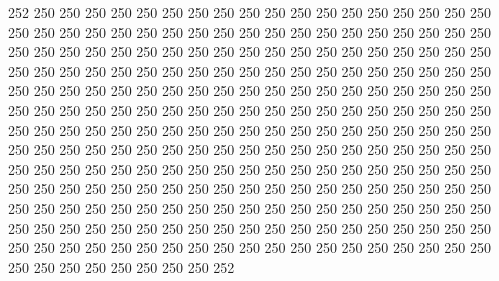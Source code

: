 252 250 250 250 250 250 250 250 250 250 250 250 250 250 250 250 250 250 250 250
250 250 250 250 250 250 250 250 250 250 250 250 250 250 250 250 250 250 250 250
250 250 250 250 250 250 250 250 250 250 250 250 250 250 250 250 250 250 250 250
250 250 250 250 250 250 250 250 250 250 250 250 250 250 250 250 250 250 250 250
250 250 250 250 250 250 250 250 250 250 250 250 250 250 250 250 250 250 250 250
250 250 250 250 250 250 250 250 250 250 250 250 250 250 250 250 250 250 250 250
250 250 250 250 250 250 250 250 250 250 250 250 250 250 250 250 250 250 250 250
250 250 250 250 250 250 250 250 250 250 250 250 250 250 250 250 250 250 250 250
250 250 250 250 250 250 250 250 250 250 250 250 250 250 250 250 250 250 250 250
250 250 250 250 250 250 250 250 250 250 250 250 250 250 250 250 250 250 250 250
250 250 250 250 250 250 250 250 250 250 250 250 250 250 250 250 250 250 250 250
250 250 250 250 250 250 250 250 250 250 250 250 250 250 250 250 250 250 250 250
250 250 250 250 250 250 250 250 250 250 250 250 250 250 250 252
